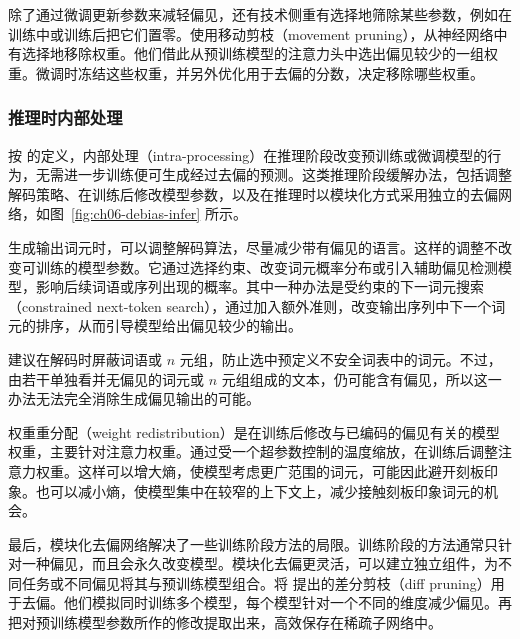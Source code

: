 除了通过微调更新参数来减轻偏见，还有技术侧重有选择地筛除某些参数，例如在训练中或训练后把它们置零。使用移动剪枝（movement pruning），从神经网络中有选择地移除权重。他们借此从预训练模型的注意力头中选出偏见较少的一组权重。微调时冻结这些权重，并另外优化用于去偏的分数，决定移除哪些权重。

\subsubsection{推理时内部处理}
按 的定义，内部处理（intra-processing）在推理阶段改变预训练或微调模型的行为，无需进一步训练便可生成经过去偏的预测。这类推理阶段缓解办法，包括调整解码策略、在训练后修改模型参数，以及在推理时以模块化方式采用独立的去偏网络，如图~\ref{fig:ch06-debias-infer} 所示。

生成输出词元时，可以调整解码算法，尽量减少带有偏见的语言。这样的调整不改变可训练的模型参数。它通过选择约束、改变词元概率分布或引入辅助偏见检测模型，影响后续词语或序列出现的概率。其中一种办法是受约束的下一词元搜索（constrained next-token search），通过加入额外准则，改变输出序列中下一个词元的排序，从而引导模型给出偏见较少的输出。

建议在解码时屏蔽词语或 $n$ 元组，防止选中预定义不安全词表中的词元。不过，由若干单独看并无偏见的词元或 $n$ 元组组成的文本，仍可能含有偏见，所以这一办法无法完全消除生成偏见输出的可能。


\begin{practicaltip}
权重重分配（weight redistribution）是在训练后修改与已编码的偏见有关的模型权重，主要针对注意力权重。通过受一个超参数控制的温度缩放，在训练后调整注意力权重。这样可以增大熵，使模型考虑更广范围的词元，可能因此避开刻板印象。也可以减小熵，使模型集中在较窄的上下文上，减少接触刻板印象词元的机会。
\end{practicaltip}

最后，模块化去偏网络解决了一些训练阶段方法的局限。训练阶段的方法通常只针对一种偏见，而且会永久改变模型。模块化去偏更灵活，可以建立独立组件，为不同任务或不同偏见将其与预训练模型组合。将 提出的差分剪枝（diff pruning）用于去偏。他们模拟同时训练多个模型，每个模型针对一个不同的维度减少偏见。再把对预训练模型参数所作的修改提取出来，高效保存在稀疏子网络中。

